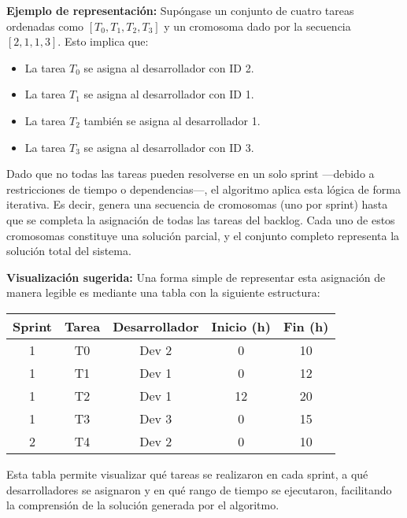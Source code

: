 \medskip

\textbf{Ejemplo de representación:}  
Supóngase un conjunto de cuatro tareas ordenadas como $[T_0, T_1, T_2, T_3]$ y un cromosoma dado por la secuencia $[2, 1, 1, 3]$. Esto implica que:
\begin{itemize}
    \item La tarea $T_0$ se asigna al desarrollador con ID 2.
    \item La tarea $T_1$ se asigna al desarrollador con ID 1.
    \item La tarea $T_2$ también se asigna al desarrollador 1.
    \item La tarea $T_3$ se asigna al desarrollador con ID 3.
\end{itemize}

\medskip

Dado que no todas las tareas pueden resolverse en un solo sprint —debido a restricciones de tiempo o dependencias—, el algoritmo aplica esta lógica de forma iterativa. Es decir, genera una secuencia de cromosomas (uno por sprint) hasta que se completa la asignación de todas las tareas del backlog. Cada uno de estos cromosomas constituye una solución parcial, y el conjunto completo representa la solución total del sistema.

\medskip

\noindent\textbf{Visualización sugerida:}  
Una forma simple de representar esta asignación de manera legible es mediante una tabla con la siguiente estructura:

\begin{center}
\begin{tabular}{|c|c|c|c|c|}
\hline
\textbf{Sprint} & \textbf{Tarea} & \textbf{Desarrollador} & \textbf{Inicio (h)} & \textbf{Fin (h)} \\
\hline
1 & T0 & Dev 2 & 0 & 10 \\
1 & T1 & Dev 1 & 0 & 12 \\
1 & T2 & Dev 1 & 12 & 20 \\
1 & T3 & Dev 3 & 0 & 15 \\
\hline
2 & T4 & Dev 2 & 0 & 10 \\
\hline
\end{tabular}
\end{center}

\noindent Esta tabla permite visualizar qué tareas se realizaron en cada sprint, a qué desarrolladores se asignaron y en qué rango de tiempo se ejecutaron, facilitando la comprensión de la solución generada por el algoritmo.


